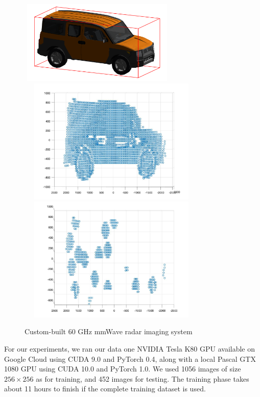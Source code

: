\begin{figure}
	\centering
	\includegraphics[width=7.5cm,height=4cm]{./figure/CAD.png}\\
	\includegraphics[width=9cm,height=6cm]{./figure/side.jpg}\\
	\includegraphics[width=9cm,height=6cm]{./figure/specular.jpg}\\
	\caption{Custom-built 60 GHz mmWave radar imaging system}
	\label{3D_synth}
\end{figure}

For our experiments, we ran our data one NVIDIA Tesla K80 GPU available on Google Cloud using CUDA 9.0 and PyTorch 0.4, along with a local Pascal GTX 1080 GPU using CUDA 10.0 and PyTorch 1.0. We used 1056 images of size $256 \times 256$ as for training, and 452 images for testing. The training phase takes about 11 hours to finish if the complete training dataset is used.

